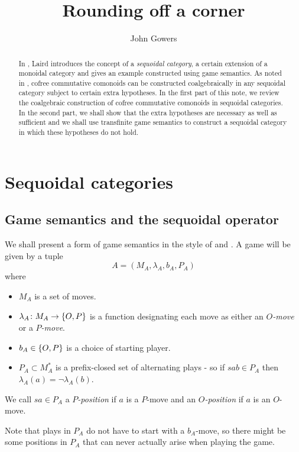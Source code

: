 \documentclass[11pt]{article}
\title{Rounding off a corner}
\author{John Gowers}
\begin{document}
\maketitle

\begin{abstract}
  In \cite{laird02}, Laird introduces the concept of a \emph{sequoidal category}, a certain extension of a monoidal category and gives an example constructed using game semantics.  As noted in \cite{martinsthesis}, cofree commutative comonoids can be constructed coalgebraically in any sequoidal category subject to certain extra hypotheses.  In the first part of this note, we review the coalgebraic construction of cofree commutative comonoids in sequoidal categories.  In the second part, we shall show that the extra hypotheses are necessary as well as sufficient and we shall use transfinite game semantics to construct a sequoidal category in which these hypotheses do not hold.
\end{abstract}

\section{Sequoidal categories}

\subsection{Game semantics and the sequoidal operator}

We shall present a form of game semantics in the style of \cite{hyland1997games} and \cite{abramskyjagadeesangames}.  A game will be given by a tuple
\[
  A = (M_A, \lambda_A, b_A, P_A)
  \]
where
\begin{itemize}
  \item $M_A$ is a set of moves.
  \item $\lambda_A\colon M_A\to\{O,P\}$ is a function designating each move as either an \emph{$O$-move} or a \emph{$P$-move}.
  \item $b_A\in\{O,P\}$ is a choice of starting player.
  \item $P_A\subset M_A^*$ is a prefix-closed set of alternating plays - so if $sab\in P_A$ then $\lambda_A(a)=\neg\lambda_A(b)$.
\end{itemize}

We call $sa\in P_A$ a \emph{$P$-position} if $a$ is a $P$-move and an \emph{$O$-position} if $a$ is an $O$-move.

Note that plays in $P_A$ do not have to start with a $b_A$-move, so there might be some positions in $P_A$ that can never actually arise when playing the game.
\end{document}
